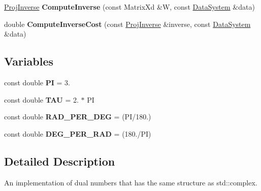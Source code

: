 \begin{DoxyCompactItemize}
\item 
\hypertarget{namespace_d_r_d_s_p_a222133a527ba815aa291e2b48f245bda}{\hyperlink{struct_d_r_d_s_p_1_1_proj_inverse}{Proj\-Inverse} {\bfseries Compute\-Inverse} (const Matrix\-Xd \&W, const \hyperlink{struct_d_r_d_s_p_1_1_data_system}{Data\-System} \&data)}\label{namespace_d_r_d_s_p_a222133a527ba815aa291e2b48f245bda}

\item 
\hypertarget{namespace_d_r_d_s_p_a1ccbd325c8cee6f342d361f818ee9d01}{double {\bfseries Compute\-Inverse\-Cost} (const \hyperlink{struct_d_r_d_s_p_1_1_proj_inverse}{Proj\-Inverse} \&inverse, const \hyperlink{struct_d_r_d_s_p_1_1_data_system}{Data\-System} \&data)}\label{namespace_d_r_d_s_p_a1ccbd325c8cee6f342d361f818ee9d01}

\end{DoxyCompactItemize}
\subsection*{Variables}
\begin{DoxyCompactItemize}
\item 
\hypertarget{namespace_d_r_d_s_p_ad47b07f4acdc0f3b71a95559987c7f76}{const double {\bfseries P\-I} = 3.}\label{namespace_d_r_d_s_p_ad47b07f4acdc0f3b71a95559987c7f76}

\item 
\hypertarget{namespace_d_r_d_s_p_a05798e4dca96bba71331b4c80d849e3d}{const double {\bfseries T\-A\-U} = 2. $\ast$ P\-I}\label{namespace_d_r_d_s_p_a05798e4dca96bba71331b4c80d849e3d}

\item 
\hypertarget{namespace_d_r_d_s_p_a11608cecd3ec1a439466b6c84e117d3f}{const double {\bfseries R\-A\-D\-\_\-\-P\-E\-R\-\_\-\-D\-E\-G} = (P\-I/180.)}\label{namespace_d_r_d_s_p_a11608cecd3ec1a439466b6c84e117d3f}

\item 
\hypertarget{namespace_d_r_d_s_p_a9879471b02473d4e18166800c39e9d59}{const double {\bfseries D\-E\-G\-\_\-\-P\-E\-R\-\_\-\-R\-A\-D} = (180./P\-I)}\label{namespace_d_r_d_s_p_a9879471b02473d4e18166800c39e9d59}

\end{DoxyCompactItemize}


\subsection{Detailed Description}
An implementation of dual numbers that has the same structure as std\-::complex. 
